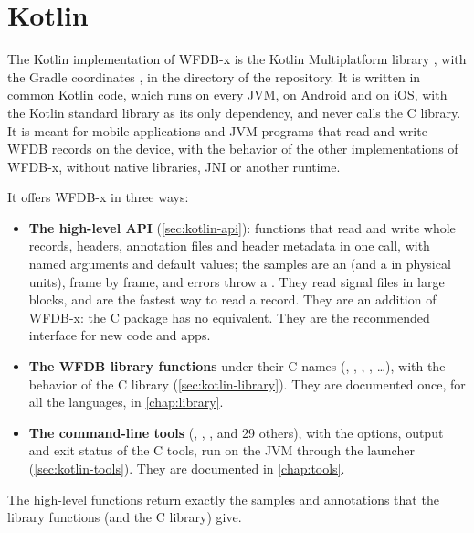 \chapter{Kotlin}
\label{chap:kotlin}

The Kotlin implementation of WFDB-x is the Kotlin Multiplatform library , with
the Gradle coordinates , in the directory
 of the repository. It is written in common Kotlin code, which runs on every
JVM, on Android and on iOS, with the Kotlin standard library as its only dependency, and
never calls the C library. It is meant for mobile applications and JVM programs that read
and write WFDB records on the device, with the behavior of the other implementations of
WFDB-x, without native libraries, JNI or another runtime.

It offers WFDB-x in three ways:
\begin{itemize}
\item \textbf{The high-level API} (\cref{sec:kotlin-api}): functions that read and write
  whole records, headers, annotation files and header metadata in one call, with named
  arguments and default values; the samples are an  (and a
   in physical units), frame by frame, and errors throw a
  . They read signal files in large blocks, and are the fastest way
  to read a record. They are an addition of WFDB-x: the C package has no equivalent. They
  are the recommended interface for new code and apps.
\item \textbf{The WFDB library functions} under their C names (,
  , , , \ldots), with the behavior of the C library
  (\cref{sec:kotlin-library}). They are documented once, for all the languages, in
  \cref{chap:library}.
\item \textbf{The command-line tools} (, , ,
   and 29 others), with the options, output and exit status of the C tools,
  run on the JVM through the launcher  (\cref{sec:kotlin-tools}).
  They are documented in \cref{chap:tools}.
\end{itemize}
The high-level functions return exactly the samples and annotations that the library
functions (and the C library) give.

